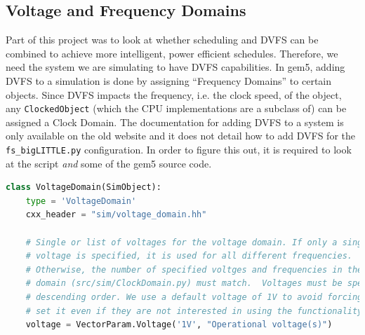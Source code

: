     \subsection{Voltage and Frequency Domains}
    Part of this project was to look at whether scheduling and DVFS can be 
    combined to achieve more intelligent, power efficient schedules. Therefore, 
    we need the system we are simulating to have DVFS capabilities. In gem5, 
    adding DVFS to a simulation is done by assigning ``Frequency Domains'' to 
    certain objects. Since DVFS impacts the frequency, i.e. the clock speed, of 
    the object, any \texttt{ClockedObject} (which the CPU implementations are a 
    subclass of) can be assigned a Clock Domain. The documentation for adding 
    DVFS to a system is only available on the old website 
    \cite{noauthor_experimenting_2019} and it does not detail how to add DVFS 
    for the \texttt{fs\_bigLITTLE.py} configuration. In order to figure this 
    out, it is required to look at the script \textit{and} some of the gem5
    source code.
    \begin{lstlisting}[caption=Lines 42-52 from 
    \texttt{gem5/src/sim/VoltageDomain.py}, basicstyle=\sffamily\footnotesize,
    language=Python]
class VoltageDomain(SimObject):
    type = 'VoltageDomain'
    cxx_header = "sim/voltage_domain.hh"
    
    # Single or list of voltages for the voltage domain. If only a single
    # voltage is specified, it is used for all different frequencies.
    # Otherwise, the number of specified voltges and frequencies in the clock
    # domain (src/sim/ClockDomain.py) must match.  Voltages must be specified in
    # descending order. We use a default voltage of 1V to avoid forcing users to
    # set it even if they are not interested in using the functionality
    voltage = VectorParam.Voltage('1V', "Operational voltage(s)")
    \end{lstlisting}
